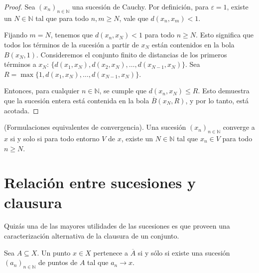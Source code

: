 \begin{proof}
	Sea $(x_n)_{n \in \mathbb{N}}$ una sucesión de Cauchy. Por definición, para $\varepsilon = 1$, existe un $N \in \mathbb{N}$ tal que para todo $n, m \geq N$, vale que $d(x_n, x_m) < 1$.

	Fijando $m=N$, tenemos que $d(x_n, x_N) < 1$ para todo $n \ge N$. Esto significa que todos los términos de la sucesión a partir de $x_N$ están contenidos en la bola $B(x_N, 1)$. Consideremos el conjunto finito de distancias de los primeros términos a $x_N$: $\{d(x_1, x_N), d(x_2, x_N), \dots, d(x_{N-1}, x_N)\}$. Sea $R = \max\{1, d(x_1, x_N), \dots, d(x_{N-1}, x_N)\}$.

	Entonces, para cualquier $n \in \mathbb{N}$, se cumple que $d(x_n, x_N) \leq R$. Esto demuestra que la sucesión entera está contenida en la bola $\overline{B}(x_N, R)$, y por lo tanto, está acotada.
\end{proof}

\begin{remark}
	(Formulaciones equivalentes de convergencia). Una sucesión $(x_n)_{n \in \mathbb{N}}$ converge a $x$ si y solo si para todo entorno $V$ de $x$, existe un $N \in \mathbb{N}$ tal que $x_n \in V$ para todo $n \geq N$.
\end{remark}

\section{Relación entre sucesiones y clausura}

Quizás una de las mayores utilidades de las sucesiones es que proveen una caracterización alternativa de la clausura de un conjunto.

\begin{proposition}
	Sea $A \subseteq X$. Un punto $x \in X$ pertenece a $\overline{A}$ si y sólo si existe una sucesión $(a_{n})_{n \in \mathbb{N}}$ de puntos de $A$ tal que $a_{n} \longrightarrow x$.
\end{proposition}

